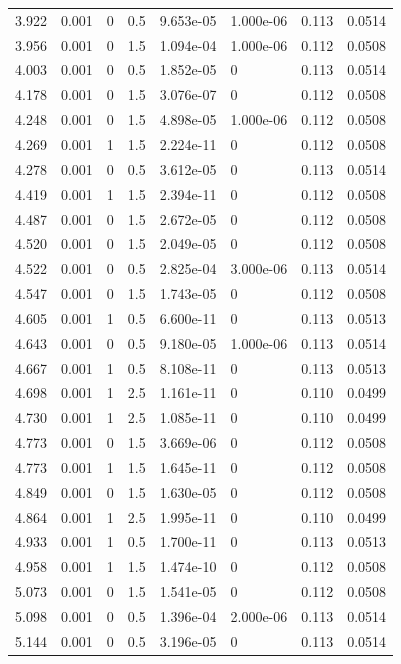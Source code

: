 \documentclass[preview]{standalone}
\begin{document}
{{{\begin{tabular}{L{1.2cm}C{1.2cm} C{0.3cm}C{0.5cm} C{1.4cm}C{1.4cm} C{1.4cm}C{1.4cm}}
  3.922  &  0.001  & 0     & 0.5 &  9.653e-05  & 1.000e-06  & 0.113 &  0.0514   \\ 
  3.956  &  0.001  & 0     & 1.5 &  1.094e-04  & 1.000e-06  & 0.112 &  0.0508   \\ 
  4.003  &  0.001  & 0     & 0.5 &  1.852e-05  & 0  & 0.113 &  0.0514   \\ 
  4.178  &  0.001  & 0     & 1.5 &  3.076e-07  & 0  & 0.112 &  0.0508   \\ 
  4.248  &  0.001  & 0     & 1.5 &  4.898e-05  & 1.000e-06  & 0.112 &  0.0508   \\ 
  4.269  &  0.001  & 1     & 1.5 &  2.224e-11  & 0  & 0.112 &  0.0508   \\ 
  4.278  &  0.001  & 0     & 0.5 &  3.612e-05  & 0  & 0.113 &  0.0514   \\ 
  4.419  &  0.001  & 1     & 1.5 &  2.394e-11  & 0  & 0.112 &  0.0508   \\ 
  4.487  &  0.001  & 0     & 1.5 &  2.672e-05  & 0  & 0.112 &  0.0508   \\ 
  4.520  &  0.001  & 0     & 1.5 &  2.049e-05  & 0  & 0.112 &  0.0508   \\ 
  4.522  &  0.001  & 0     & 0.5 &  2.825e-04  & 3.000e-06  & 0.113 &  0.0514   \\ 
  4.547  &  0.001  & 0     & 1.5 &  1.743e-05  & 0  & 0.112 &  0.0508   \\ 
  4.605  &  0.001  & 1     & 0.5 &  6.600e-11  & 0  & 0.113 &  0.0513   \\ 
  4.643  &  0.001  & 0     & 0.5 &  9.180e-05  & 1.000e-06  & 0.113 &  0.0514   \\ 
  4.667  &  0.001  & 1     & 0.5 &  8.108e-11  & 0  & 0.113 &  0.0513   \\ 
  4.698  &  0.001  & 1     & 2.5 &  1.161e-11  & 0  & 0.110 &  0.0499   \\ 
  4.730  &  0.001  & 1     & 2.5 &  1.085e-11  & 0  & 0.110 &  0.0499   \\ 
  4.773  &  0.001  & 0     & 1.5 &  3.669e-06  & 0  & 0.112 &  0.0508   \\ 
  4.773  &  0.001  & 1     & 1.5 &  1.645e-11  & 0  & 0.112 &  0.0508   \\ 
  4.849  &  0.001  & 0     & 1.5 &  1.630e-05  & 0  & 0.112 &  0.0508   \\ 
  4.864  &  0.001  & 1     & 2.5 &  1.995e-11  & 0  & 0.110 &  0.0499   \\ 
  4.933  &  0.001  & 1     & 0.5 &  1.700e-11  & 0  & 0.113 &  0.0513   \\ 
  4.958  &  0.001  & 1     & 1.5 &  1.474e-10  & 0  & 0.112 &  0.0508   \\ 
  5.073  &  0.001  & 0     & 1.5 &  1.541e-05  & 0  & 0.112 &  0.0508   \\ 
  5.098  &  0.001  & 0     & 0.5 &  1.396e-04  & 2.000e-06  & 0.113 &  0.0514   \\ 
  5.144  &  0.001  & 0     & 0.5 &  3.196e-05  & 0  & 0.113 &  0.0514   \\ 
\hline 
\end{tabular} 

}}}
\end{document}
